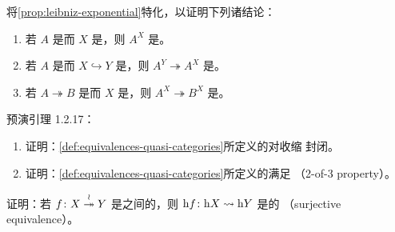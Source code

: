 \begin{exercise}\label{ex:leibniz-specialization}
将\cref{prop:leibniz-exponential}特化，以证明下列诸结论：
\begin{enumerate}[label=(\roman*)]
\item 若 $A$ 是\trQuasiCategory{}而 $X$ 是\trSimplicialSet{}，则 $A^X$ 是\trQuasiCategory{}。
\item 若 $A$ 是\trQuasiCategory{}而 $X\hookrightarrow Y$ 是\trMonomorphism{}，则
$A^Y\twoheadrightarrow A^X$ 是\trIsofibration{}。
\item 若 $A\twoheadrightarrow B$ 是\trIsofibration{}而 $X$ 是\trSimplicialSet{}，则
$A^X\twoheadrightarrow B^X$ 是\trIsofibration{}。
\end{enumerate}
\end{exercise}

\begin{exercise}\label{ex:equivalences-calculus}
预演引理 1.2.17：
\begin{enumerate}[label=(\roman*)]
\item 证明：\cref{def:equivalences-quasi-categories}所定义的\trEquivalence{}对收缩
封闭。
\item 证明：\cref{def:equivalences-quasi-categories}所定义的\trEquivalence{}满足%
\trTwoOfThreeProperty{}（2-of-3 property）。
\end{enumerate}
\end{exercise}

\begin{exercise}\label{ex:hf-surjective-equivalence}
证明：若 $f\colon X\overset{\wr}{\twoheadrightarrow} Y$ 是\trQuasiCategory{}之间的\trTrivialFibration{}，则\trFunctor
$\mathrm{h}f\colon\mathrm{h}X\rightsquigarrow\mathrm{h}Y$ 是\trCategory{}的\trSurjectiveEquivalence
（surjective equivalence）。
\end{exercise}
